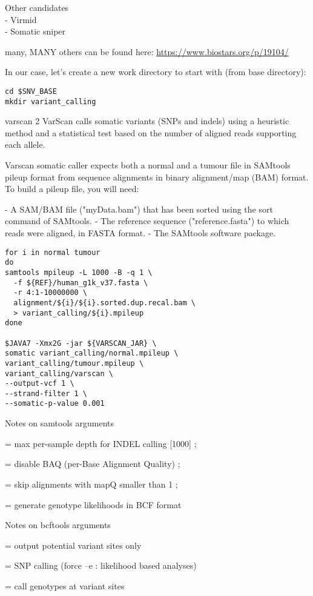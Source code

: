 Other candidates \\
- Virmid \\
- Somatic sniper

many, MANY others can be found here:
\url{https://www.biostars.org/p/19104/}


In our case, let's create a new work directory to start with (from base directory):

\begin{lstlisting}
cd $SNV_BASE
mkdir variant_calling
\end{lstlisting}

varscan 2
VarScan calls somatic variants (SNPs and indels) using a heuristic method and a statistical test based on the number of aligned reads supporting each allele.

Varscan somatic caller expects both a normal and a tumour file in SAMtools pileup format from sequence alignments in binary alignment/map (BAM) format. To build a pileup file, you will need:

- A SAM/BAM file ("myData.bam") that has been sorted using the sort command of SAMtools.
- The reference sequence ("reference.fasta") to which reads were aligned, in FASTA format.
- The SAMtools software package.


\begin{lstlisting}
for i in normal tumour
do
samtools mpileup -L 1000 -B -q 1 \
  -f ${REF}/human_g1k_v37.fasta \
  -r 4:1-10000000 \
  alignment/${i}/${i}.sorted.dup.recal.bam \
  > variant_calling/${i}.mpileup
done

$JAVA7 -Xmx2G -jar ${VARSCAN_JAR} \
somatic variant_calling/normal.mpileup \
variant_calling/tumour.mpileup \
variant_calling/varscan \
--output-vcf 1 \
--strand-filter 1 \
--somatic-p-value 0.001 
\end{lstlisting}

Notes on samtools arguments
\begin{description}[style=multiline,labelindent=0cm,align=right,leftmargin=\descriptionlabelspace,rightmargin=1.5cm,font=\ttfamily]
	\item[-L] = max per-sample depth for INDEL calling [1000] ; 
	\item[-B] = disable BAQ (per-Base Alignment Quality) ; 
	\item[-q] = skip alignments with mapQ smaller than 1 ; 
	\item[-g] = generate genotype likelihoods in BCF format
\end{description} 

Notes on bcftools arguments
\begin{description}[style=multiline,labelindent=0cm,align=right,leftmargin=\descriptionlabelspace,rightmargin=1.5cm,font=\ttfamily]
	\item[-v] = output potential variant sites only
	\item[-c] = SNP calling (force –e : likelihood based analyses)
	\item[-g] = call genotypes at variant sites
\end{description}

